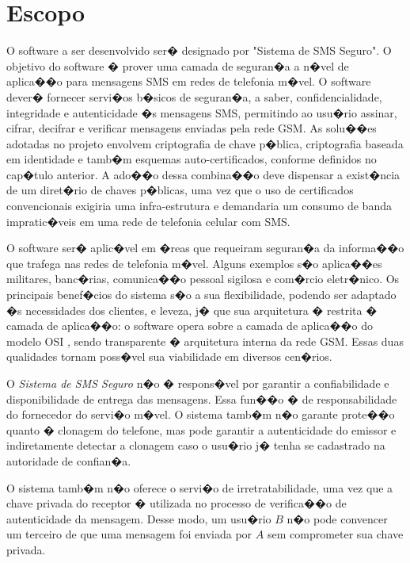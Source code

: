\documentclass[a4paper,capchap,espacoduplo,normaltoc]{abntepusp}
\begin{document}
\section{Escopo}
O software a ser desenvolvido ser� designado por "Sistema de SMS Seguro". O objetivo do software � prover uma camada de seguran�a a n�vel de aplica��o para mensagens SMS em redes de telefonia m�vel. O software dever� fornecer servi�os b�sicos de seguran�a, a saber, confidencialidade, integridade e autenticidade �s mensagens SMS, permitindo ao usu�rio assinar, cifrar, decifrar e verificar mensagens enviadas pela rede GSM. As solu��es adotadas no projeto envolvem criptografia de chave p�blica, criptografia baseada em identidade e tamb�m esquemas auto-certificados, conforme definidos no cap�tulo anterior. A ado��o dessa combina��o deve dispensar a exist�ncia de um diret�rio de chaves p�blicas, uma vez que o uso de certificados convencionais exigiria uma infra-estrutura e demandaria um consumo de banda impratic�veis em uma rede de telefonia celular com SMS.

O software ser� aplic�vel em �reas que requeiram seguran�a da informa��o que trafega nas redes de telefonia m�vel. Alguns exemplos s�o aplica��es militares, banc�rias, comunica��o pessoal sigilosa e com�rcio eletr�nico. Os principais benef�cios do sistema s�o a sua flexibilidade, podendo ser adaptado �s necessidades dos clientes, e leveza, j� que sua arquitetura � restrita � camada de aplica��o: o software opera sobre a camada de aplica��o do modelo OSI \cite{osi}, sendo transparente � arquitetura interna da rede GSM. Essas duas qualidades tornam poss�vel sua viabilidade em diversos cen�rios.

O \emph{Sistema de SMS Seguro} n�o � respons�vel por garantir a confiabilidade e disponibilidade de entrega das mensagens. Essa fun��o � de responsabilidade do fornecedor do servi�o m�vel.
O sistema tamb�m n�o garante prote��o quanto � clonagem do telefone, mas pode garantir a autenticidade do emissor e indiretamente detectar a clonagem caso o usu�rio j� tenha se cadastrado na autoridade de confian�a.

O sistema tamb�m n�o oferece o servi�o de irretratabilidade, uma vez que a chave privada do receptor � utilizada no processo de verifica��o de autenticidade da mensagem. Desse modo, um usu�rio $B$ n�o pode convencer um terceiro de que uma mensagem foi enviada por $A$ sem comprometer sua chave privada.
\end{document}
